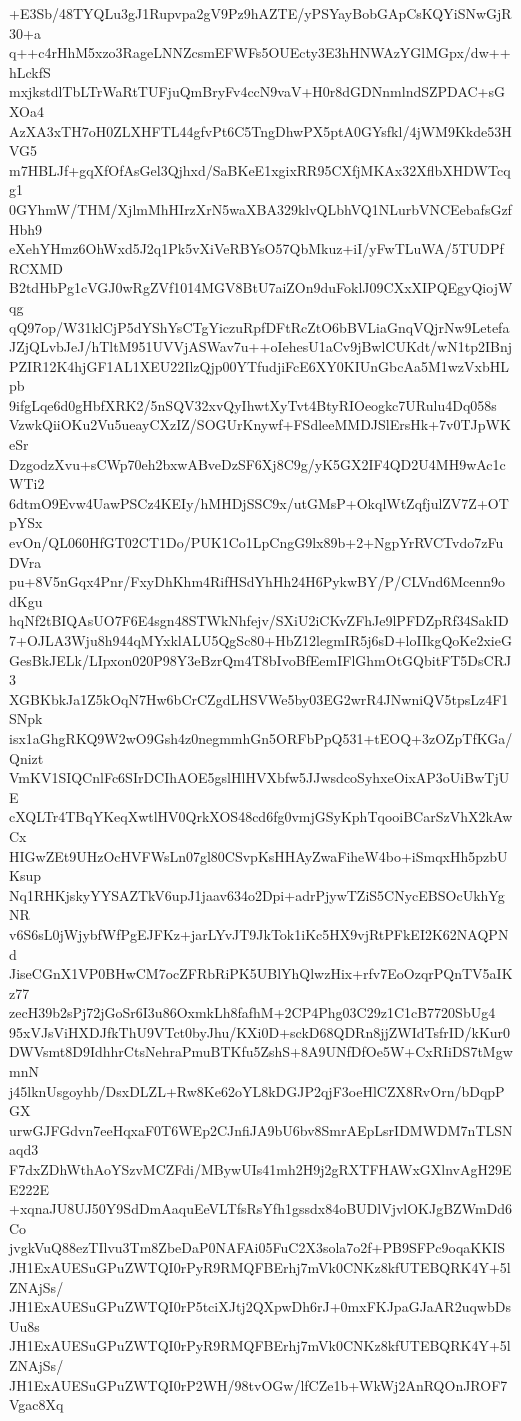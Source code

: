 +E3Sb/48TYQLu3gJ1Rupvpa2gV9Pz9hAZTE/yPSYayBobGApCsKQYiSNwGjR30+a
q++c4rHhM5xzo3RageLNNZcsmEFWFs5OUEcty3E3hHNWAzYGlMGpx/dw++hLckfS
mxjkstdlTbLTrWaRtTUFjuQmBryFv4ccN9vaV+H0r8dGDNnmlndSZPDAC+sGXOa4
AzXA3xTH7oH0ZLXHFTL44gfvPt6C5TngDhwPX5ptA0GYsfkl/4jWM9Kkde53HVG5
m7HBLJf+gqXfOfAsGel3Qjhxd/SaBKeE1xgixRR95CXfjMKAx32XflbXHDWTcqg1
0GYhmW/THM/XjlmMhHIrzXrN5waXBA329klvQLbhVQ1NLurbVNCEebafsGzfHbh9
eXehYHmz6OhWxd5J2q1Pk5vXiVeRBYsO57QbMkuz+iI/yFwTLuWA/5TUDPfRCXMD
B2tdHbPg1cVGJ0wRgZVf1014MGV8BtU7aiZOn9duFoklJ09CXxXIPQEgyQiojWqg
qQ97op/W31klCjP5dYShYsCTgYiczuRpfDFtRcZtO6bBVLiaGnqVQjrNw9Letefa
JZjQLvbJeJ/hTltM951UVVjASWav7u++oIehesU1aCv9jBwlCUKdt/wN1tp2IBnj
PZIR12K4hjGF1AL1XEU22IlzQjp00YTfudjiFcE6XY0KIUnGbcAa5M1wzVxbHLpb
9ifgLqe6d0gHbfXRK2/5nSQV32xvQyIhwtXyTvt4BtyRIOeogkc7URulu4Dq058s
VzwkQiiOKu2Vu5ueayCXzIZ/SOGUrKnywf+FSdleeMMDJSlErsHk+7v0TJpWKeSr
DzgodzXvu+sCWp70eh2bxwABveDzSF6Xj8C9g/yK5GX2IF4QD2U4MH9wAc1cWTi2
6dtmO9Evw4UawPSCz4KEIy/hMHDjSSC9x/utGMsP+OkqlWtZqfjulZV7Z+OTpYSx
evOn/QL060HfGT02CT1Do/PUK1Co1LpCngG9lx89b+2+NgpYrRVCTvdo7zFuDVra
pu+8V5nGqx4Pnr/FxyDhKhm4RifHSdYhHh24H6PykwBY/P/CLVnd6Mcenn9odKgu
hqNf2tBIQAsUO7F6E4sgn48STWkNhfejv/SXiU2iCKvZFhJe9lPFDZpRf34SakID
7+OJLA3Wju8h944qMYxklALU5QgSc80+HbZ12legmIR5j6sD+loIIkgQoKe2xieG
GesBkJELk/LIpxon020P98Y3eBzrQm4T8bIvoBfEemIFlGhmOtGQbitFT5DsCRJ3
XGBKbkJa1Z5kOqN7Hw6bCrCZgdLHSVWe5by03EG2wrR4JNwniQV5tpsLz4F1SNpk
isx1aGhgRKQ9W2wO9Gsh4z0negmmhGn5ORFbPpQ531+tEOQ+3zOZpTfKGa/Qnizt
VmKV1SIQCnlFc6SIrDCIhAOE5gslHlHVXbfw5JJwsdcoSyhxeOixAP3oUiBwTjUE
cXQLTr4TBqYKeqXwtlHV0QrkXOS48cd6fg0vmjGSyKphTqooiBCarSzVhX2kAwCx
HIGwZEt9UHzOcHVFWsLn07gl80CSvpKsHHAyZwaFiheW4bo+iSmqxHh5pzbUKsup
Nq1RHKjskyYYSAZTkV6upJ1jaav634o2Dpi+adrPjywTZiS5CNycEBSOcUkhYgNR
v6S6sL0jWjybfWfPgEJFKz+jarLYvJT9JkTok1iKc5HX9vjRtPFkEI2K62NAQPNd
JiseCGnX1VP0BHwCM7ocZFRbRiPK5UBlYhQlwzHix+rfv7EoOzqrPQnTV5aIKz77
zecH39b2sPj72jGoSr6I3u86OxmkLh8fafhM+2CP4Phg03C29z1C1cB7720SbUg4
95xVJsViHXDJfkThU9VTct0byJhu/KXi0D+sckD68QDRn8jjZWIdTsfrID/kKur0
DWVsmt8D9IdhhrCtsNehraPmuBTKfu5ZshS+8A9UNfDfOe5W+CxRIiDS7tMgwmnN
j45lknUsgoyhb/DsxDLZL+Rw8Ke62oYL8kDGJP2qjF3oeHlCZX8RvOrn/bDqpPGX
urwGJFGdvn7eeHqxaF0T6WEp2CJnfiJA9bU6bv8SmrAEpLsrIDMWDM7nTLSNaqd3
F7dxZDhWthAoYSzvMCZFdi/MBywUIs41mh2H9j2gRXTFHAWxGXlnvAgH29EE222E
+xqnaJU8UJ50Y9SdDmAaquEeVLTfsRsYfh1gssdx84oBUDlVjvlOKJgBZWmDd6Co
jvgkVuQ88ezTIlvu3Tm8ZbeDaP0NAFAi05FuC2X3sola7o2f+PB9SFPc9oqaKKIS
JH1ExAUESuGPuZWTQI0rPyR9RMQFBErhj7mVk0CNKz8kfUTEBQRK4Y+5lZNAjSs/
JH1ExAUESuGPuZWTQI0rP5tciXJtj2QXpwDh6rJ+0mxFKJpaGJaAR2uqwbDsUu8s
JH1ExAUESuGPuZWTQI0rPyR9RMQFBErhj7mVk0CNKz8kfUTEBQRK4Y+5lZNAjSs/
JH1ExAUESuGPuZWTQI0rP2WH/98tvOGw/lfCZe1b+WkWj2AnRQOnJROF7Vgac8Xq
